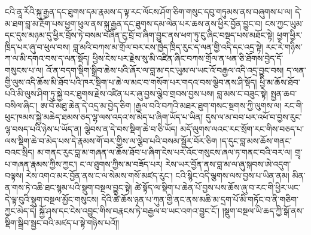 \documentclass{article}
\begin{document}
ངའི་ནཱ་རོའི་སྐུ་རྒྱན་དང་ཐུགས་དམ་རྣམས་ད་ལྟ་རང་ལོངས་ཤོག་ཅིག་གསུང་དབུ་གཏུམས་ནས་བཞུགས་པ་ལ། དེ་མ་ཐག་བླ་མ་རྔོག་པས་ཕྱག་ཕུལ་ནས་སྐུ་རྒྱན་དང་ཐུགས་དམ་ལེན་པར་ཆས་ནས་ཕྱིར་བྱོན་བྱུང་བ། ངས་ཀྱང་ཡུམ་དང་དུས་མཉམ་དུ་ཕྱིར་བྲོས་ཏེ་བསམ་བཞིན་ངུ་བྲོ་བ་ཞིག་བྱུང་ནས་ཕག་ཏུ་ངུ་ཞིང་བསྡད་པས་མཐོང་སྟེ། ཕྱག་ཕྱིར་ཁྲིད་པར་ཞུ་བ་ཕུལ་བས། བླ་མའི་བཀས་མ་གྲོལ་བར་ངས་ཁྱེད་ཁྲིད་རུང་ད་ལན་གྱི་འདི་དང་འདྲ་སྟེ། རང་རེ་གཉིས་ཀ་ལ་མི་དགའ་བས་ད་ལན་སྡོད། ཕྱིས་ངེས་པར་རྗེས་སུ་མི་འཛིན་ཞིང་བཀས་གྲོལ་ན་ཕན་ཅི་ཐོགས་བྱེད་དོ་གསུངས་པ་ལ། འོ་ན་བདག་སྡིག་སྒྲིབ་ཆེས་པའི་ཞོར་ལ་བླ་མ་དང་ཡུམ་ལ་ཡང་འོ་བརྒྱལ་འདི་འདྲ་བྱུང་བས། ད་ལན་གྱི་ལུས་འདི་ཆོས་མི་ཐོབ་པའི་ཁར་སྡིག་པ་ཆེ་ལ་མང་བ་གསོག་པར་གདའ་བས་ལྕེབ་ནས་ཤི་སྡོད། ཕྱི་མ་ཆོས་ཐོབ་པའི་མི་ལུས་ཤིག་ཏུ་སྐྱེ་བར་ཐུགས་རྗེས་འཛིན་པར་ཞུ་བྱས་ལྕེབ་གྲབས་བྱས་པས། བླ་མས་ང་བཟུང་སྟེ། སྤྱན་ཆབ་བསིལ་ཞིང་། ཨ་བོ་མཐུ་ཆེན་དེ་འདྲ་མ་བྱེད་ཅིག །རྒྱལ་བའི་བཀའི་མཐར་ཐུག་གསང་སྔགས་ཀྱི་ལུགས་ལ། རང་གི་ཕུང་ཁམས་སྐྱེ་མཆེད་ཐམས་ཅད་ལྷ་ལས་འདའ་ས་མེད་པ་ཞིག་ཡོད་པ་ཡིན། དུས་ལ་མ་བབ་པར་འཕོ་བ་བྱས་རུང་ལྷ་བསད་པའི་ཉེས་པ་ཡོད་ན། ལྕེབས་ན་དེ་བས་སྡིག་ཆེ་བ་ཅི་ཡོད། མདོ་ལུགས་ལའང་རང་སྲོག་རང་གིས་བཅད་པ་ལས་སྡིག་ཆེ་བ་མེད་པས་དེ་རྣམས་གོ་བར་གྱིས་ལ་ལྕེབ་པའི་བསམ་སྦྱོར་བོར་ཅིག །ད་དུང་བླ་མས་ཆོས་གནང་བའང་སྲིད། མ་གནང་རུང་བླ་མ་གཞན་ལ་ཆོས་ཐོབ་པ་ཞིག་ངེས་པར་འོང་གསུངས་ཞལ་ཏ་གནང་བའི་བར་ལ། གྲྭ་པ་གཞན་རྣམས་ཀྱིས་ཀྱང་། ང་ལ་ཐུགས་ཀྱིས་མ་བཟོད་པར། རེས་ཡར་བྱོན་ནས་བླ་མ་ལ་ཞུ་སྐབས་ཨེ་འདུག་བལྟས། རེས་འགའ་མར་བྱོན་ནས་ང་ལ་སེམས་གསོ་མཛད་རུང་། ངའི་སྙིང་འདི་ལྕགས་ལས་བྱས་པ་ཡིན་ནམ། མིན་ན་གས་ཏེ་འཆི་ཐང་སྙམ་པའི་སྡུག་བསྔལ་བྱུང་སྟེ། ཚེ་སྟོད་ལ་སྡིག་པ་ཆེན་པོ་བྱས་པས་ཆོས་ཞུ་བ་རང་གི་ཕྱིར་ཡང་དེ་ལྟ་བུའི་སྡུག་བསྔལ་མྱོང་གསུངས། དེའི་ཚེ་ཆོས་ཉན་པ་ཀུན་གྱི་ནང་ནས་མཆི་མ་དྲག་པོ་མི་གཏོང་བ་ནི་གཅིག་ཀྱང་མེད་དེ། སྐྱོ་ཤས་དང་ངེས་འབྱུང་གིས་བརྣངས་ཏེ་བརྒྱལ་བ་ཡང་འགའ་བྱུང་ངོ་། །སྡུག་བསྔལ་ཡི་ཆད་ཀྱི་སྒོ་ནས་སྡིག་སྒྲིབ་སྦྱང་བའི་མཛད་པ་སྟེ་གཉིས་པའོ།།
\end{document}
